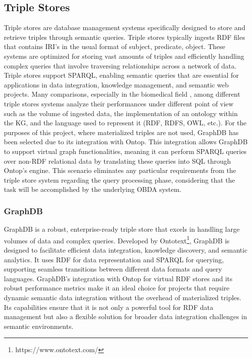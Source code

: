 \subsection{Triple Stores}
Triple stores are database management systems specifically designed to store and retrieve triples through semantic queries. Triple stores typically ingests \ac{RDF} files that contains IRI's in the usual format of subject, predicate, object. These systems are optimized for storing vast amounts of triples and efficiently handling complex queries that involve traversing relationships across a network of data. Triple stores support \ac{SPARQL}, enabling semantic queries that are essential for applications in data integration, knowledge management, and semantic web projects.
Many comparisons, especially in the biomedical field \cite{DBLP:journals/entropy/CanSBU17}, among different triple stores systems analyze their performances under different point of view such as the volume of ingested data, the implementation of an ontology within the \ac{KG}, and the language used to represent it (\ac{RDF}, RDFS, \ac{OWL}, etc.).
For the purposes of this project, where materialized triples are not used, GraphDB has been selected due to its integration with Ontop. This integration allows GraphDB to support virtual graph functionalities, meaning it can perform \ac{SPARQL} queries over non-RDF relational data by translating these queries into \ac{SQL} through Ontop's engine. This scenario eliminates any particular requirements from the triple store system regarding the query processing phase, considering that the task will be accomplished by the underlying \ac{OBDA} system.

\subsubsection{GraphDB}
GraphDB is a robust, enterprise-ready triple store that excels in handling large volumes of data and complex queries. Developed by Ontotext\footnote{https://www.ontotext.com/}, GraphDB is designed to facilitate efficient data integration, knowledge discovery, and semantic analytics. It uses \ac{RDF} for data representation and \ac{SPARQL} for querying, supporting seamless transitions between different data formats and query languages.
GraphDB's integration with Ontop for virtual \ac{RDF} stores and its robust performance metrics make it an ideal choice for projects that require dynamic semantic data integration without the overhead of materialized triples. Its capabilities ensure that it is not only a powerful tool for \ac{RDF} data management but also a flexible solution for broader data integration challenges in semantic environments.